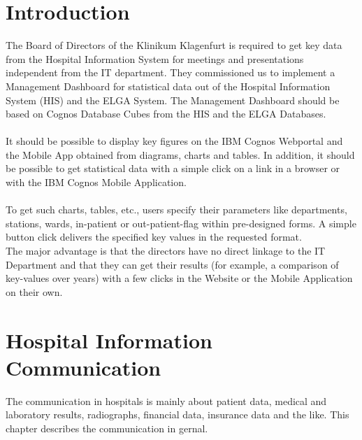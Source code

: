 \documentclass[a4paper]{article}
\begin{document}
	\section{Introduction}
	The Board of Directors of the Klinikum Klagenfurt is required to get
	key data from the Hospital Information System for
	meetings and presentations independent from the IT department.
	They commissioned us to implement a Management Dashboard for statistical
	data out of the Hospital Information System (HIS) and the ELGA System. The Management Dashboard
	should be based on Cognos Database Cubes from the HIS and the ELGA Databases.\\
	\\
	It should be possible to display key figures on the IBM Cognos
	Webportal and the Mobile App obtained from diagrams, charts and tables.
	In addition, it should be possible to get statistical data with a
	simple click on a link in a browser or with the IBM Cognos Mobile Application.\\
	\\
	To get such charts, tables, etc., users specify their parameters like
	departments, stations, wards, in-patient or out-patient-flag within
	pre-designed forms. A simple button click delivers the specified key values in
	the requested format.\\
	The major advantage is that the directors have no direct linkage to the
	IT Department and that they can get their results (for example, a comparison of
	key-values over years) with a few clicks in the Website or the Mobile
	Application on their own.
	\newpage
	
	\section{Hospital Information Communication}
		The communication in hospitals is mainly about patient data,
		medical and laboratory results, radiographs, financial data, insurance
		data and the like. This chapter describes the communication in gernal.
\end{document}
